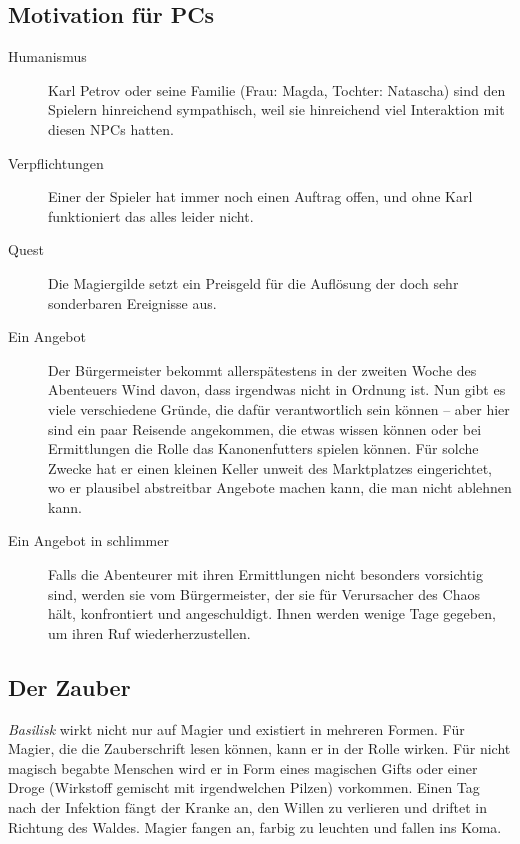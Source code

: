 \documentclass[a4paper,10pt]{scrartcl}
\def\drugname{Basilisk}
\begin{document}
\subsection{Motivation für PCs}

\begin{description}
  \item[Humanismus] Karl Petrov oder seine Familie (Frau: Magda,
    Tochter: Natascha) sind den Spielern hinreichend sympathisch, weil
    sie hinreichend viel Interaktion mit diesen NPCs hatten.
  \item[Verpflichtungen] Einer der Spieler hat immer noch einen Auftrag
    offen, und ohne Karl funktioniert das alles leider nicht.
  \item[Quest] Die Magiergilde setzt ein Preisgeld für die Auflösung der
    doch sehr sonderbaren Ereignisse aus.
  \item[Ein Angebot] Der Bürgermeister bekommt allerspätestens in der
    zweiten Woche des Abenteuers Wind davon, dass irgendwas nicht in
    Ordnung ist. Nun gibt es viele verschiedene Gründe, die dafür
    verantwortlich sein können -- aber hier sind ein paar Reisende
    angekommen, die etwas wissen können oder bei Ermittlungen die Rolle
    das Kanonenfutters spielen können. Für solche Zwecke hat er einen
    kleinen Keller unweit des Marktplatzes eingerichtet, wo er plausibel
    abstreitbar Angebote machen kann, die man nicht ablehnen kann.
  \item[Ein Angebot in schlimmer] Falls die Abenteurer mit ihren
    Ermittlungen nicht besonders vorsichtig sind, werden sie vom
    Bürgermeister, der sie für Verursacher des Chaos hält, konfrontiert
    und angeschuldigt. Ihnen werden wenige Tage gegeben, um ihren Ruf
    wiederherzustellen.
\end{description}

\subsection{Der Zauber}

\zauber[name=\drugname{},
  stufe=7,
  art=Wortzauber,
  prozess=Verändern,
  agens=Feuer,
  reagens=Feuer,
  Wz=Geist,
  Wb=Person,
  Wd={4W6 Tage},
Ur={dämonisch}]{}

\emph{\drugname{}} wirkt nicht nur auf Magier und existiert in mehreren Formen.
Für Magier, die die Zauberschrift lesen können, kann er in der Rolle
wirken. Für nicht magisch begabte Menschen wird er in Form eines
magischen Gifts oder einer Droge (Wirkstoff gemischt mit irgendwelchen
Pilzen) vorkommen. Einen Tag nach der Infektion fängt der Kranke an, den
Willen zu verlieren und driftet in Richtung des Waldes. Magier fangen
an, farbig zu leuchten und fallen ins Koma.
\end{document}
